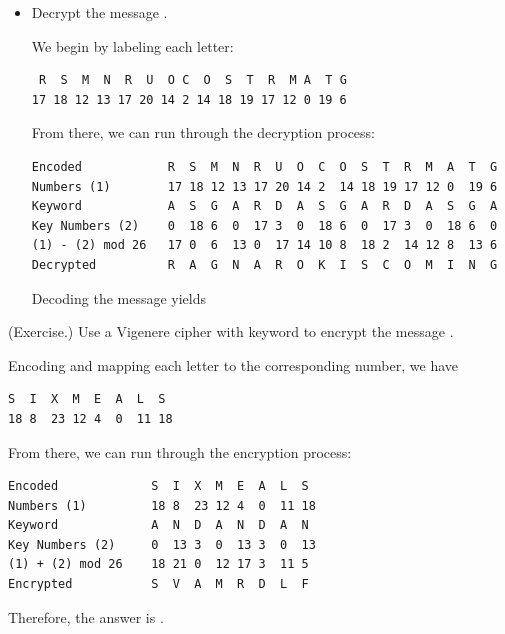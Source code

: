 \documentclass[letterpaper]{article}
\newcommand{\0}{\mathbf{0}}
\begin{document}
\begin{mdframed}
\begin{itemize}
        \item Decrypt the message .
        \begin{mdframed}
            We begin by labeling each letter: 
            \begin{mdframed}
                \begin{verbatim}
 R  S  M  N  R  U  O C  O  S  T  R  M A  T G
17 18 12 13 17 20 14 2 14 18 19 17 12 0 19 6\end{verbatim}
            \end{mdframed}
            From there, we can run through the decryption process: 
            \begin{mdframed}
\begin{verbatim}
Encoded            R  S  M  N  R  U  O  C  O  S  T  R  M  A  T  G
Numbers (1)        17 18 12 13 17 20 14 2  14 18 19 17 12 0  19 6
Keyword            A  S  G  A  R  D  A  S  G  A  R  D  A  S  G  A 
Key Numbers (2)    0  18 6  0  17 3  0  18 6  0  17 3  0  18 6  0 
(1) - (2) mod 26   17 0  6  13 0  17 14 10 8  18 2  14 12 8  13 6
Decrypted          R  A  G  N  A  R  O  K  I  S  C  O  M  I  N  G\end{verbatim}
            \end{mdframed}
            Decoding the message yields
            \begin{mdframed}
            \end{mdframed}
        \end{mdframed}
    \end{itemize}
\end{mdframed}

\begin{mdframed}
    (Exercise.) Use a Vigenere cipher with keyword  to encrypt the message . 

    \begin{mdframed}
        Encoding and mapping each letter to the corresponding number, we have 
        \begin{mdframed}
            \begin{verbatim}
S  I  X  M  E  A  L  S
18 8  23 12 4  0  11 18\end{verbatim}
        \end{mdframed}

        From there, we can run through the encryption process: 
        \begin{mdframed}
            \begin{verbatim}
Encoded             S  I  X  M  E  A  L  S
Numbers (1)         18 8  23 12 4  0  11 18
Keyword             A  N  D  A  N  D  A  N
Key Numbers (2)     0  13 3  0  13 3  0  13
(1) + (2) mod 26    18 21 0  12 17 3  11 5
Encrypted           S  V  A  M  R  D  L  F\end{verbatim}
        \end{mdframed}
        Therefore, the answer is .
    \end{mdframed}
\end{mdframed}
\end{document}
